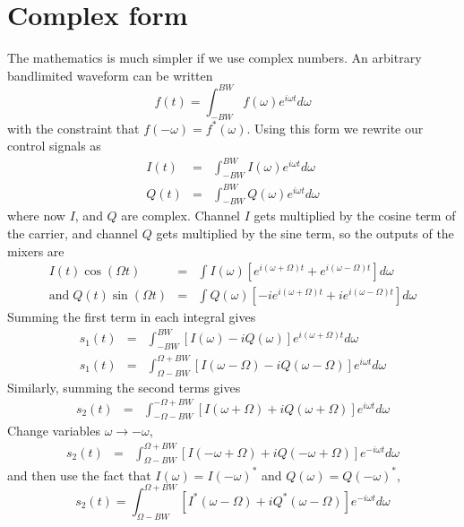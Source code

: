 \documentclass{article}
\begin{document}
\section{Complex form}

The mathematics is much simpler if we use complex numbers. An arbitrary
bandlimited waveform can be written\[
f(t)=\int_{-BW}^{BW}f(\omega)e^{i\omega t}d\omega\]
 with the constraint that $f(-\omega)=f^{*}(\omega)$. Using this
form we rewrite our control signals as\begin{eqnarray*}
I(t) & = & \int_{-BW}^{BW}I(\omega)e^{i\omega t}d\omega\\
Q(t) & = & \int_{-BW}^{BW}Q(\omega)e^{i\omega t}d\omega\end{eqnarray*}
 where now $I$, and $Q$ are complex. Channel $I$ gets multiplied
by the cosine term of the carrier, and channel $Q$ gets multiplied
by the sine term, so the outputs of the mixers are\begin{eqnarray*}
I(t)\cos(\Omega t) & = & \int I(\omega)\left[e^{i\left(\omega+\Omega\right)t}+e^{i\left(\omega-\Omega\right)t}\right]d\omega\\
\textrm{and}\; Q(t)\sin(\Omega t) & = & \int Q(\omega)\left[-ie^{i\left(\omega+\Omega\right)t}+ie^{i\left(\omega-\Omega\right)t}\right]d\omega\end{eqnarray*}
 Summing the first term in each integral gives\begin{eqnarray*}
s_{1}(t) & = & \int_{-BW}^{BW}\left[I\left(\omega\right)-iQ(\omega)\right]e^{i(\omega+\Omega)t}d\omega\\
s_{1}(t) & = & \int_{\Omega-BW}^{\Omega+BW}\left[I\left(\omega-\Omega\right)-iQ\left(\omega-\Omega\right)\right]e^{i\omega t}d\omega\end{eqnarray*}
 Similarly, summing the second terms gives\begin{eqnarray*}
s_{2}(t) & = & \int_{-\Omega-BW}^{-\Omega+BW}\left[I\left(\omega+\Omega\right)+iQ\left(\omega+\Omega\right)\right]e^{i\omega t}d\omega\end{eqnarray*}
 Change variables $\omega\rightarrow-\omega$,\begin{eqnarray*}
s_{2}(t) & = & \int_{\Omega-BW}^{\Omega+BW}\left[I\left(-\omega+\Omega\right)+iQ\left(-\omega+\Omega\right)\right]e^{-i\omega t}d\omega\end{eqnarray*}
 and then use the fact that $I(\omega)=I(-\omega)^{*}$ and $Q(\omega)=Q(-\omega)^{*}$,
\[
s_{2}(t)=\int_{\Omega-BW}^{\Omega+BW}\left[I^{*}\left(\omega-\Omega\right)+iQ^{*}\left(\omega-\Omega\right)\right]e^{-i\omega t}d\omega\]
\end{document}
